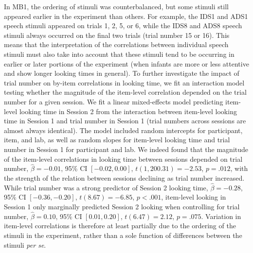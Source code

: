 \documentclass[
  english,
  man, donotrepeattitle,floatsintext]{apa6}
\begin{document}
In MB1, the ordering of stimuli was counterbalanced, but some stimuli still appeared earlier in the experiment than others. For example, the IDS1 and ADS1 speech stimuli appeared on trials 1, 2, 5, or 6, while the IDS8 and ADS8 speech stimuli always occurred on the final two trials (trial number 15 or 16). This means that the interpretation of the correlations between individual speech stimuli must also take into account that these stimuli tend to be occurring in earlier or later portions of the experiment (when infants are more or less attentive and show longer looking times in general). To further investigate the impact of trial number on by-item correlations in looking time, we fit an interaction model testing whether the magnitude of the item-level correlation depended on the trial number for a given session. We fit a linear mixed-effects model predicting item-level looking time in Session 2 from the interaction between item-level looking time in Session 1 and trial number in Session 1 (trial numbers across sessions are almost always identical). The model included random intercepts for participant, item, and lab, as well as random slopes for item-level looking time and trial number in Session 1 for participant and lab. We indeed found that the magnitude of the item-level correlations in looking time between sessions depended on trial number, \(\hat{\beta} = -0.01\), 95\% CI \([-0.02, 0.00]\), \(t(1,200.31) = -2.53\), \(p = .012\), with the strength of the relation between sessions declining as trial number increased. While trial number was a strong predictor of Session 2 looking time, \(\hat{\beta} = -0.28\), 95\% CI \([-0.36, -0.20]\), \(t(8.67) = -6.85\), \(p < .001\), item-level looking in Session 1 only marginally predicted Session 2 looking when controlling for trial number, \(\hat{\beta} = 0.10\), 95\% CI \([0.01, 0.20]\), \(t(6.47) = 2.12\), \(p = .075\). Variation in item-level correlations is therefore at least partially due to the ordering of the stimuli in the experiment, rather than a sole function of differences between the stimuli \emph{per se}.
\end{document}

